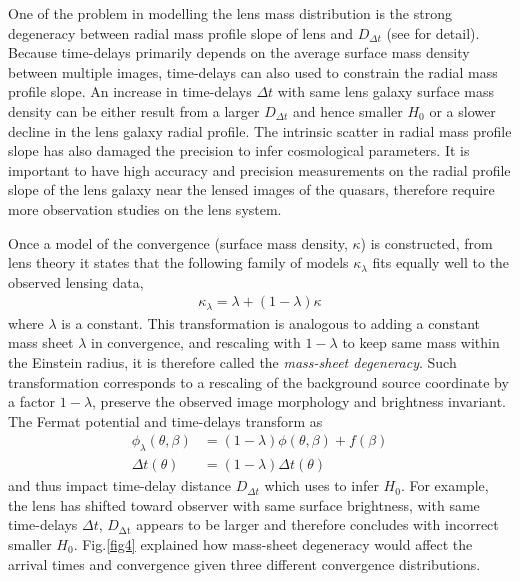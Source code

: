 \documentclass{cosmo}
\begin{document}
    One of the problem in modelling the lens mass distribution is the strong degeneracy between radial mass profile slope of lens and $D_{\Delta t}$ (see \citealt{Suyu2012} for detail). Because time-delays primarily depends on the average surface mass density between multiple images, time-delays can also used to constrain the radial mass profile slope. An increase in time-delays $\Delta t$ with same lens galaxy surface mass density can be either result from a larger $D_{\Delta t}$ and hence smaller $H_\mathrm{0}$ or a slower decline in the lens galaxy radial profile. The intrinsic scatter in radial mass profile slope has also damaged the precision to infer cosmological parameters. It is important to have high accuracy and precision measurements on the radial profile slope of the lens galaxy near the lensed images of the quasars, therefore require more observation studies on the lens system.
    
    Once a model of the convergence (surface mass density, $\kappa$) is constructed, from lens theory it states that the following family of models $\kappa_{\lambda}$ fits equally well to the observed lensing data,
    \begin{align*}
        \kappa_{\lambda} = \lambda + (1-\lambda)\kappa
    \end{align*}
    where $\lambda$ is a constant. This transformation is analogous to adding a constant mass sheet $\lambda$ in convergence, and rescaling with $1-\lambda$ to keep same mass within the Einstein radius, it is therefore called the \emph{mass-sheet degeneracy}. Such transformation corresponds to a rescaling of the background source coordinate by a factor $1-\lambda$, preserve the observed image morphology and brightness invariant.
    The Fermat potential and time-delays transform as 
    \begin{align*}
        \phi_{\lambda} (\theta, \beta) &= (1-\lambda) \phi(\theta, \beta) + f(\beta)\\
        \Delta t (\theta) &= (1-\lambda) \Delta t (\theta) 
    \end{align*}
    and thus impact time-delay distance $D_{\Delta t}$ which uses to infer $H_\mathrm{0}$. For example, the lens has shifted toward observer with same surface brightness, with same time-delays $\Delta t$, $D_{\mathrm{\Delta t}}$ appears to be larger and therefore concludes with incorrect smaller $H_\mathrm{0}$. Fig.\ref{fig4} explained how mass-sheet degeneracy would affect the arrival times and convergence given three different convergence distributions.  
    
\end{document}

